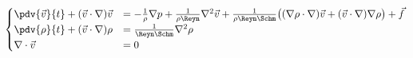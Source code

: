 \begin{equation}\label{eq:vdinse_nd_sys}
\begin{cases}
  \pdv{\vec{v}}{t} + (\vec{v} \cdot \nabla)\vec{v} &=
    - \frac{1}{\rho} \nabla{p}
    + \frac{1}{\rho\Reyn} \nabla^2 \vec{v}
    + \frac{1}{\rho\Reyn\Schm} \big(
          (\nabla{\rho} \cdot \nabla)\vec{v}
        + (\vec{v} \cdot \nabla)\nabla\rho
      \big)
    + \vec{f}
  \\
  \pdv{\rho}{t} + (\vec{v} \cdot \nabla)\rho &=
    \frac{1}{\Reyn\Schm} \nabla^2 \rho
  \\
  \nabla \cdot \vec{v} &= 0 \vphantom{\frac{1}{\Re}}
\end{cases}
\end{equation}
